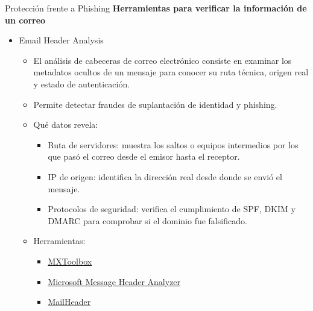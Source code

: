 \documentclass[aspectratio=169,11pt]{beamer}
\newcommand{\lead}[1]{{\color{uznavy}\bfseries #1}\par\smallskip}
\begin{document}
\begin{frame}[allowframebreaks]{Protección frente a Phishing}
\small
\lead{Herramientas para verificar la información de un correo}
  \begin{itemize}
  \item Email Header Analysis
    \begin{itemize}
    \item El análisis de cabeceras de correo electrónico consiste en examinar los metadatos ocultos de un mensaje para conocer su ruta técnica, origen real y estado de autenticación.
    \item Permite detectar fraudes de suplantación de identidad y phishing.
    \item Qué datos revela:
      \begin{itemize}
      \item Ruta de servidores: muestra los saltos o equipos intermedios por los que pasó el correo desde el emisor hasta el receptor.
      \item IP de origen: identifica la dirección real desde donde se envió el mensaje.
      \item Protocolos de seguridad: verifica el cumplimiento de SPF, DKIM y DMARC para comprobar si el dominio fue falsificado.
      \end{itemize}
    \item Herramientas:
      \begin{itemize}
      \item \href{https://mxtoolbox.com/EmailHeaders.aspx}{MXToolbox}
      \item \href{https://mha.azurewebsites.net/}{Microsoft Message Header Analyzer}
      \item \href{https://mailheader.org/}{MailHeader}
      \end{itemize}
    \end{itemize}


\end{itemize}
\end{frame}
\end{document}
